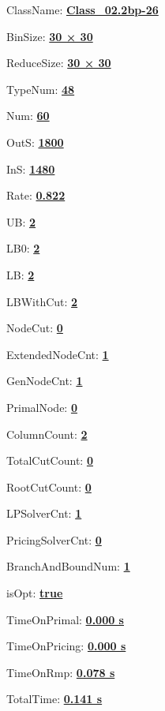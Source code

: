 \documentclass[11pt]{article}
\begin{document}
\pagestyle{empty}


ClassName: \underline{\textbf{Class_02.2bp-26}}
\par
BinSize: \underline{\textbf{30 × 30}}
\par
ReduceSize: \underline{\textbf{30 × 30}}
\par
TypeNum: \underline{\textbf{48}}
\par
Num: \underline{\textbf{60}}
\par
OutS: \underline{\textbf{1800}}
\par
InS: \underline{\textbf{1480}}
\par
Rate: \underline{\textbf{0.822}}
\par
UB: \underline{\textbf{2}}
\par
LB0: \underline{\textbf{2}}
\par
LB: \underline{\textbf{2}}
\par
LBWithCut: \underline{\textbf{2}}
\par
NodeCut: \underline{\textbf{0}}
\par
ExtendedNodeCnt: \underline{\textbf{1}}
\par
GenNodeCnt: \underline{\textbf{1}}
\par
PrimalNode: \underline{\textbf{0}}
\par
ColumnCount: \underline{\textbf{2}}
\par
TotalCutCount: \underline{\textbf{0}}
\par
RootCutCount: \underline{\textbf{0}}
\par
LPSolverCnt: \underline{\textbf{1}}
\par
PricingSolverCnt: \underline{\textbf{0}}
\par
BranchAndBoundNum: \underline{\textbf{1}}
\par
isOpt: \underline{\textbf{true}}
\par
TimeOnPrimal: \underline{\textbf{0.000 s}}
\par
TimeOnPricing: \underline{\textbf{0.000 s}}
\par
TimeOnRmp: \underline{\textbf{0.078 s}}
\par
TotalTime: \underline{\textbf{0.141 s}}
\par
\newpage
\end{document}

